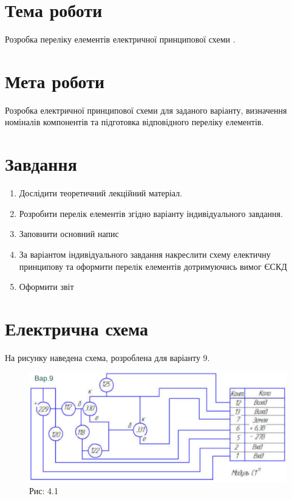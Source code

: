 \documentclass[a4paper]{article}
\begin{document}
\section*{Тема роботи}
Розробка
переліку елементів електричної принципової схеми .

\section*{Мета роботи}
Розробка електричної принципової схеми для заданого варіанту, визначення номіналів компонентів та підготовка відповідного переліку елементів.

\section*{Завдання}

\begin{enumerate}
    \item Дослідити теоретичний лекційний матеріал.
    \item Розробити перелік елементів згідно варіанту індивідуального завдання.
    \item Заповнити основний напис
    \item За варіантом індивідуального завдання накреслити схему електичну принципову та оформити перелік елементів дотримуючись вимог ЄСКД
    \item Оформити звіт
\end{enumerate}

\section*{Електрична схема}
На рисунку наведена схема, розроблена для варіанту 9.

\begin{figure}[h]
    \centering
    \includegraphics[width=1\textwidth]{imgs/PW4.1.png}
    \caption*{Рис: 4.1}
\end{figure}
\end{document}
